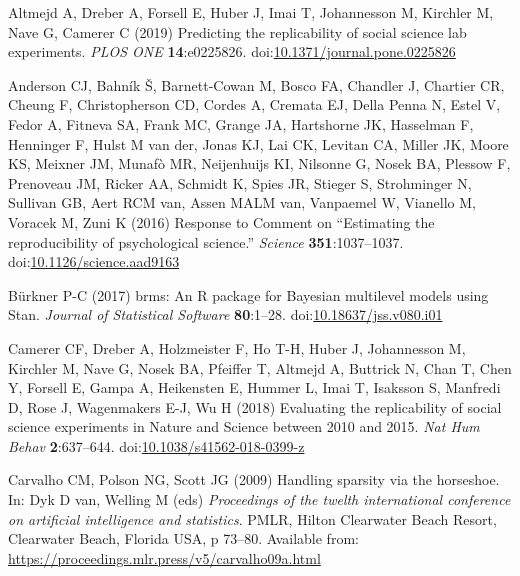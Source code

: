 \documentclass[
  english,
  a4paper,
]{article}
\newlength{\cslhangindent}
\newlength{\cslentryspacingunit} %
\newenvironment{CSLReferences}[2] %
 {%
  \setlength{\parindent}{0pt}
  \ifodd #1
  \let\oldpar\par
  \def\par{\hangindent=\cslhangindent\oldpar}
  \fi
  \setlength{\parskip}{#2\cslentryspacingunit}
 }%
 {}
\begin{document}
\hypertarget{refs}{}
\begin{CSLReferences}{1}{0}
\leavevmode{}%
Altmejd A, Dreber A, Forsell E, Huber J, Imai T, Johannesson M, Kirchler M, Nave G, Camerer C (2019) Predicting the replicability of social science lab experiments. \emph{PLOS ONE} \textbf{14}:e0225826. doi:\href{https://doi.org/10.1371/journal.pone.0225826}{10.1371/journal.pone.0225826}

\leavevmode{}%
Anderson CJ, Bahník Š, Barnett-Cowan M, Bosco FA, Chandler J, Chartier CR, Cheung F, Christopherson CD, Cordes A, Cremata EJ, Della Penna N, Estel V, Fedor A, Fitneva SA, Frank MC, Grange JA, Hartshorne JK, Hasselman F, Henninger F, Hulst M van der, Jonas KJ, Lai CK, Levitan CA, Miller JK, Moore KS, Meixner JM, Munafò MR, Neijenhuijs KI, Nilsonne G, Nosek BA, Plessow F, Prenoveau JM, Ricker AA, Schmidt K, Spies JR, Stieger S, Strohminger N, Sullivan GB, Aert RCM van, Assen MALM van, Vanpaemel W, Vianello M, Voracek M, Zuni K (2016) Response to {Comment} on {``{Estimating} the reproducibility of psychological science.''} \emph{Science} \textbf{351}:1037--1037. doi:\href{https://doi.org/10.1126/science.aad9163}{10.1126/science.aad9163}

\leavevmode{}%
Bürkner P-C (2017) {brms}: An {R} package for {Bayesian} multilevel models using {Stan}. \emph{Journal of Statistical Software} \textbf{80}:1--28. doi:\href{https://doi.org/10.18637/jss.v080.i01}{10.18637/jss.v080.i01}

\leavevmode{}%
Camerer CF, Dreber A, Holzmeister F, Ho T-H, Huber J, Johannesson M, Kirchler M, Nave G, Nosek BA, Pfeiffer T, Altmejd A, Buttrick N, Chan T, Chen Y, Forsell E, Gampa A, Heikensten E, Hummer L, Imai T, Isaksson S, Manfredi D, Rose J, Wagenmakers E-J, Wu H (2018) Evaluating the replicability of social science experiments in {Nature} and {Science} between 2010 and 2015. \emph{Nat Hum Behav} \textbf{2}:637--644. doi:\href{https://doi.org/10.1038/s41562-018-0399-z}{10.1038/s41562-018-0399-z}

\leavevmode{}%
Carvalho CM, Polson NG, Scott JG (2009) Handling sparsity via the horseshoe. In: Dyk D van, Welling M (eds) \emph{Proceedings of the twelth international conference on artificial intelligence and statistics}. PMLR, Hilton Clearwater Beach Resort, Clearwater Beach, Florida USA, p 73--80. Available from: \url{https://proceedings.mlr.press/v5/carvalho09a.html}


\end{CSLReferences}
\end{document}

